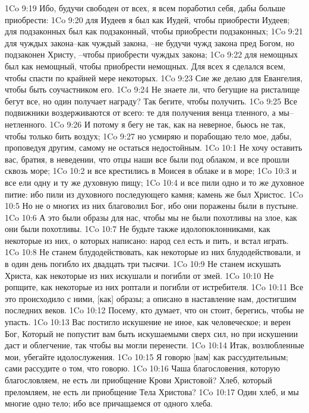 1Co 9:19  Ибо, будучи свободен от всех, я всем поработил себя, дабы больше приобрести:
1Co 9:20  для Иудеев я был как Иудей, чтобы приобрести Иудеев; для подзаконных был как подзаконный, чтобы приобрести подзаконных;
1Co 9:21  для чуждых закона--как чуждый закона, --не будучи чужд закона пред Богом, но подзаконен Христу, --чтобы приобрести чуждых закона;
1Co 9:22  для немощных был как немощный, чтобы приобрести немощных. Для всех я сделался всем, чтобы спасти по крайней мере некоторых.
1Co 9:23  Сие же делаю для Евангелия, чтобы быть соучастником его.
1Co 9:24  Не знаете ли, что бегущие на ристалище бегут все, но один получает награду? Так бегите, чтобы получить.
1Co 9:25  Все подвижники воздерживаются от всего: те для получения венца тленного, а мы--нетленного.
1Co 9:26  И потому я бегу не так, как на неверное, бьюсь не так, чтобы только бить воздух;
1Co 9:27  но усмиряю и порабощаю тело мое, дабы, проповедуя другим, самому не остаться недостойным.
1Co 10:1  Не хочу оставить вас, братия, в неведении, что отцы наши все были под облаком, и все прошли сквозь море;
1Co 10:2  и все крестились в Моисея в облаке и в море;
1Co 10:3  и все ели одну и ту же духовную пищу;
1Co 10:4  и все пили одно и то же духовное питие: ибо пили из духовного последующего камня; камень же был Христос.
1Co 10:5  Но не о многих из них благоволил Бог, ибо они поражены были в пустыне.
1Co 10:6  А это были образы для нас, чтобы мы не были похотливы на злое, как они были похотливы.
1Co 10:7  Не будьте также идолопоклонниками, как некоторые из них, о которых написано: народ сел есть и пить, и встал играть.
1Co 10:8  Не станем блудодействовать, как некоторые из них блудодействовали, и в один день погибло их двадцать три тысячи.
1Co 10:9  Не станем искушать Христа, как некоторые из них искушали и погибли от змей.
1Co 10:10  Не ропщите, как некоторые из них роптали и погибли от истребителя.
1Co 10:11  Все это происходило с ними, [как] образы; а описано в наставление нам, достигшим последних веков.
1Co 10:12  Посему, кто думает, что он стоит, берегись, чтобы не упасть.
1Co 10:13  Вас постигло искушение не иное, как человеческое; и верен Бог, Который не попустит вам быть искушаемыми сверх сил, но при искушении даст и облегчение, так чтобы вы могли перенести.
1Co 10:14  Итак, возлюбленные мои, убегайте идолослужения.
1Co 10:15  Я говорю [вам] как рассудительным; сами рассудите о том, что говорю.
1Co 10:16  Чаша благословения, которую благословляем, не есть ли приобщение Крови Христовой? Хлеб, который преломляем, не есть ли приобщение Тела Христова?
1Co 10:17  Один хлеб, и мы многие одно тело; ибо все причащаемся от одного хлеба.
